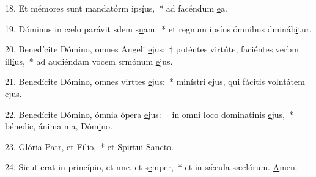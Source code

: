 18. Et mémores sunt mandatórm ips\uline{í}us,~* ad facéndum \uline{e}a.\par 
19. Dóminus in cælo parávit sdem s\uline{u}am:~* et regnum ipsíus ómnibus dmináb\uline{i}tur.\par 
20. Benedícite Dómino, omnes Angeli \uline{e}jus:~† poténtes virtúte, faciéntes verbm ill\uline{í}us,~* ad audiéndam vocem srmónum \uline{e}jus.\par 
21. Benedícite Dómino, omnes virttes \uline{e}jus:~* minístri ejus, qui fácitis volntátem \uline{e}jus.\par 
22. Benedícite Dómino, ómnia ópera \uline{e}jus:~† in omni loco dominatinis \uline{e}jus,~* bénedic, ánima ma, Dóm\uline{i}no.\par 
23. Glória Patr, et F\uline{í}lio,~* et Spirtui S\uline{a}ncto.\par 
24. Sicut erat in princípio, et nnc, et s\uline{e}mper,~* et in sǽcula sæclórum. \uline{A}men.\par 
